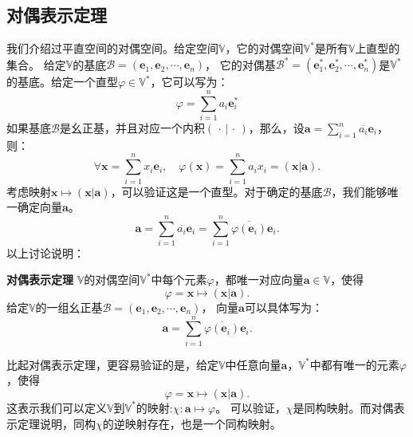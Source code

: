 \documentclass[12pt,UTF8,fontset=none]{ctexbook}
\begin{document}
\subsection{对偶表示定理}
我们介绍过平直空间的对偶空间。给定空间$\mathbb{V}$，它的对偶空间$\mathbb{V}^*$是所有$\mathbb{V}$上直型的集合。
给定$\mathbb{V}$的基底$\mathcal{B} = (\mathbf{e}_1, \mathbf{e}_2, \cdots , \mathbf{e}_n )$，
它的对偶基$\mathcal{B}^* = (\mathbf{e}_1^*, \mathbf{e}_2^*, \cdots , \mathbf{e}_n^*)$是$\mathbb{V}^*$的基底。给定一个直型$\varphi \in \mathbb{V}^*$，它可以写为：
$$ \varphi = \sum_{i=1}^n a_i \mathbf{e}_i^* $$
如果基底$\mathcal{B}$是幺正基，并且对应一个内积$(\,\cdot \,|\, \cdot\,)$，那么，设$ \mathbf{a} = \sum_{i=1}^n \overline{a_i} \mathbf{e}_i $，则：
$$ \forall \mathbf{x} = \sum_{i=1}^n x_i \mathbf{e}_i, \quad \varphi(\mathbf{x}) = \sum_{i=1}^n a_i x_i = (\mathbf{x} | \mathbf{a}). $$
考虑映射$\mathbf{x} \mapsto (\mathbf{x} | \mathbf{a})$，可以验证这是一个直型。对于确定的基底$\mathcal{B}$，我们能够唯一确定向量$\mathbf{a}$。
$$ \mathbf{a} = \sum_{i=1}^n \overline{a_i} \mathbf{e}_i = \sum_{i=1}^n \overline{\varphi(\mathbf{e}_i)} \mathbf{e}_i.$$
以上讨论说明：
\begin{pp}\textbf{对偶表示定理}\label{pp:8_2}
    $\mathbb{V}$的对偶空间$\mathbb{V}^*$中每个元素$\varphi$，都唯一对应向量$\mathbf{a} \in \mathbb{V}$，使得
    $$ \varphi = \mathbf{x} \mapsto (\mathbf{x} | \mathbf{a}). $$
    给定$\mathbb{V}$的一组幺正基$\mathcal{B} = (\mathbf{e}_1, \mathbf{e}_2, \cdots , \mathbf{e}_n )$，
    向量$\mathbf{a}$可以具体写为：
    $$ \mathbf{a} = \sum_{i=1}^n \overline{\varphi(\mathbf{e}_i)} \mathbf{e}_i.$$
\end{pp}

比起对偶表示定理，更容易验证的是，给定$\mathbb{V}$中任意向量$\mathbf{a}$，$\mathbb{V}^*$中都有唯一的元素$\varphi$，使得
$$ \varphi = \mathbf{x} \mapsto (\mathbf{x} | \mathbf{a}). $$
这表示我们可以定义$\mathbb{V}$到$\mathbb{V}^*$的映射:$\chi : \mathbf{a} \mapsto \varphi$。
可以验证，$\chi$是同构映射。而对偶表示定理说明，同构$\chi$的逆映射存在，也是一个同构映射。
\end{document}
